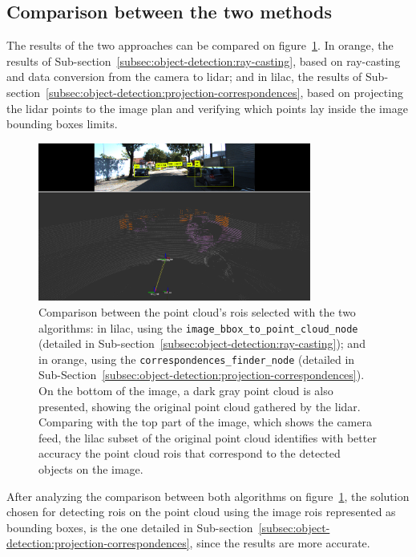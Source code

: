 \subsection{Comparison between the two methods}
The results of the two approaches can be compared on figure~\ref{fig:rois-matching-comparison}. In orange, the results of Sub-section~\ref{subsec:object-detection:ray-casting}, based on ray-casting and data conversion from the camera to \ac{lidar}; and in lilac, the results of Sub-section~\ref{subsec:object-detection:projection-correspondences}, based on projecting the \ac{lidar} points to the image plan and verifying which points lay inside the image bounding boxes limits.


\begin{figure}[H]
	\centering
	\includegraphics[width=0.8\textwidth]{img/image-object-to-point-cloud/rois-comparison.png}
	\caption{Comparison between the point cloud's \acp{roi} selected with the two algorithms: in lilac, using the \texttt{image\_bbox\_to\_point\_cloud\_node} (detailed in Sub-section~\ref{subsec:object-detection:ray-casting}); and in orange, using the \texttt{correspondences\_finder\_node} (detailed in Sub-Section~\ref{subsec:object-detection:projection-correspondences}). On the bottom of the image, a dark gray point cloud is also presented, showing the original point cloud gathered by the \ac{lidar}. Comparing with the top part of the image, which shows the camera feed, the lilac subset of the original point cloud identifies with better accuracy the point cloud \acp{roi} that correspond to the detected objects on the image.}
	\label{fig:rois-matching-comparison}
\end{figure}

After analyzing the comparison between both algorithms on figure~\ref{fig:rois-matching-comparison}, the solution chosen for detecting \acp{roi} on the point cloud using the image \acp{roi} represented as bounding boxes, is the one detailed in Sub-section~\ref{subsec:object-detection:projection-correspondences}, since the results are more accurate.

